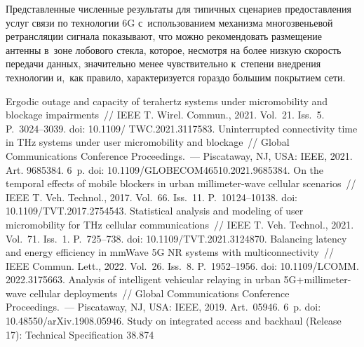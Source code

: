 \begin{multicols}{2}
     Представленные численные результаты для типичных сценариев 
предоставления услуг связи по технологии 6G с~использованием механизма 
многозвеньевой ретрансляции сигнала показывают, что можно 
рекомендовать размещение антенны в~зоне лобового стекла, которое, 
несмотря на более низкую скорость передачи данных, значительно менее 
чувствительно к~степени внедрения технологии и,~как правило, 
характеризуется гораздо б$\acute{\mbox{о}}$льшим покрытием сети.
     
{\small\frenchspacing
 {%
 \begin{thebibliography}{99}
Ergodic outage and capacity of terahertz systems under micromobility and blockage impairments~// 
IEEE T. Wirel. Commun., 2021. Vol.~21. Iss.~5. P.~3024--3039. doi: 
10.1109/ TWC.2021.3117583.
Uninterrupted connectivity time in THz systems under user micromobility and blockage~//  
Global Communications Conference Proceedings.~--- Piscataway, NJ, USA: 
IEEE, 2021. Art. 9685384. 6~p. doi: 10.1109/GLOBECOM46510.2021.9685384.
 On the temporal effects of mobile 
blockers in urban millimeter-wave cellular scenarios~// IEEE T. Veh. Technol., 
2017. Vol.~66. Iss.~11. P.~10124--10138. doi: 10.1109/TVT.2017.2754543.
 Statistical 
analysis and modeling of user micromobility for THz cellular communications~// IEEE T. 
Veh. Technol., 2021. Vol.~71. Iss.~1. P.~725--738. doi: 10.1109/TVT.2021.3124870.
 Balancing latency and energy efficiency in mmWave 5G NR systems with 
multiconnectivity~// IEEE Commun. Lett., 2022. Vol.~26. Iss.~8. P.~1952--1956. doi: 
10.1109/LCOMM. 2022.3175663.
 Analysis of intelligent vehicular 
relaying in urban 5G\;+\;millimeter-wave cellular deployments~// Global Communications 
Conference Proceedings.~--- Piscataway, NJ, USA: IEEE, 2019. Art.~05946. 
6~p. doi: 10.48550/arXiv.1908.05946.
Study on integrated access and backhaul (Release 17): Technical Specification 38.874 

\end{thebibliography}}}
\end{multicols}
